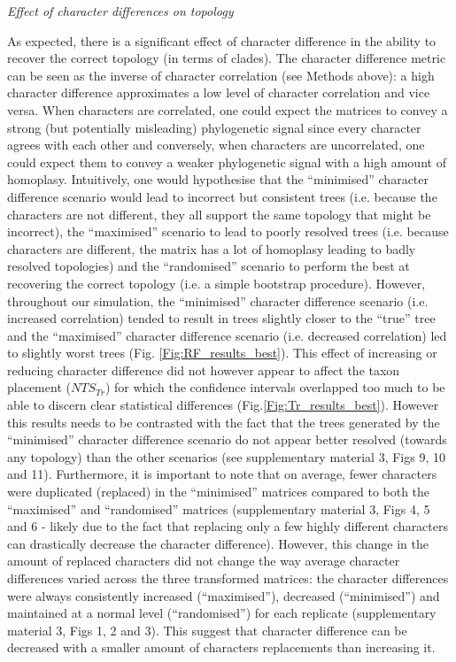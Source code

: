 \documentclass[12pt,letterpaper]{article}
\renewcommand{\subsection}[1]{%
\bigskip
\begin{center}
\begin{large}
\normalfont\itshape #1
\end{large}
\end{center}}
\begin{document}
\subsection{Effect of character differences on topology}
As expected, there is a significant effect of character difference in the ability to recover the correct topology (in terms of clades).
The character difference metric can be seen as the inverse of character correlation (see Methods above): a high character difference approximates a low level of character correlation and vice versa.
When characters are correlated, one could expect the matrices to convey a strong (but potentially misleading) phylogenetic signal since every character agrees with each other and conversely, when characters are uncorrelated, one could expect them to convey a weaker phylogenetic signal with a high amount of homoplasy.
Intuitively, one would hypothesise that the ``minimised'' character difference scenario would lead to incorrect but consistent trees (i.e. because the characters are not different, they all support the same topology that might be incorrect), the ``maximised'' scenario to lead to poorly resolved trees (i.e. because characters are different, the matrix has a lot of homoplasy leading to badly resolved topologies) and the ``randomised'' scenario to perform the best at recovering the correct topology (i.e. a simple bootstrap procedure). 
However, throughout our simulation, the ``minimised'' character difference scenario (i.e. increased correlation) tended to result in trees slightly closer to the ``true'' tree and the ``maximised'' character difference scenario (i.e. decreased correlation) led to slightly worst trees (Fig. \ref{Fig:RF_results_best}).
This effect of increasing or reducing character difference did not however appear to affect the taxon placement ($NTS_{Tr}$) for which the confidence intervals overlapped too much to be able to discern clear statistical differences (Fig.\ref{Fig:Tr_results_best}).
However this results needs to be contrasted with the fact that the trees generated by the ``minimised'' character difference scenario do not appear better resolved (towards any topology) than the other scenarios (see supplementary material 3, Figs 9, 10 and 11).
Furthermore, it is important to note that on average, fewer characters were duplicated (replaced) in the ``minimised'' matrices compared to both the ``maximised'' and ``randomised'' matrices (supplementary material 3, Figs 4, 5 and 6 - likely due to the fact that replacing only a few highly different characters can drastically decrease the character difference).
However, this change in the amount of replaced characters did not change the way average character differences varied across the three transformed matrices: the character differences were always consistently increased (``maximised''), decreased (``minimised'') and maintained at a normal level (``randomised'') for each replicate (supplementary material 3, Figs 1, 2 and 3).
This suggest that character difference can be decreased with a smaller amount of characters replacements than increasing it.
\end{document}
